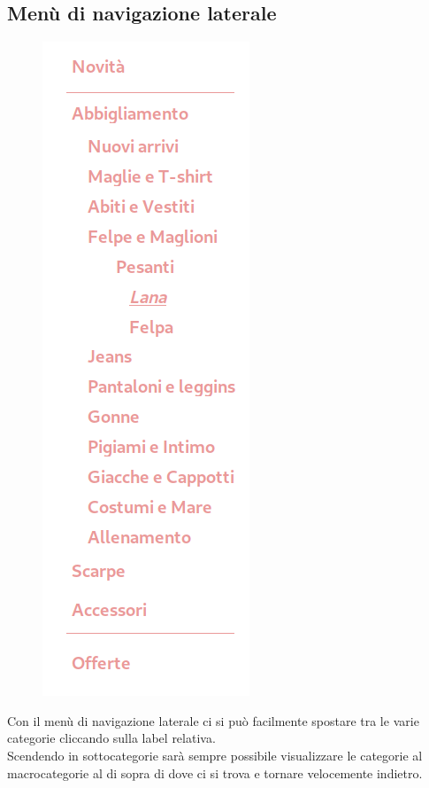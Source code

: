 \documentclass[12pt,a4paper]{report}
\begin{document}
\subsection{Menù di navigazione laterale}
\begin{figure}
  \includegraphics[height=0.5\textheight]{"Images Latex/Immagini Wireframe/Desktop/7 - Dettagli Prodotto"}
  \vspace{-200pt}
\end{figure}
Con il menù di navigazione laterale ci si può facilmente spostare tra le varie categorie cliccando sulla label relativa.\\
Scendendo in sottocategorie sarà sempre possibile visualizzare le categorie al macrocategorie al di sopra di dove ci si trova e tornare velocemente indietro.\\
\vspace{180pt}
\end{document}

